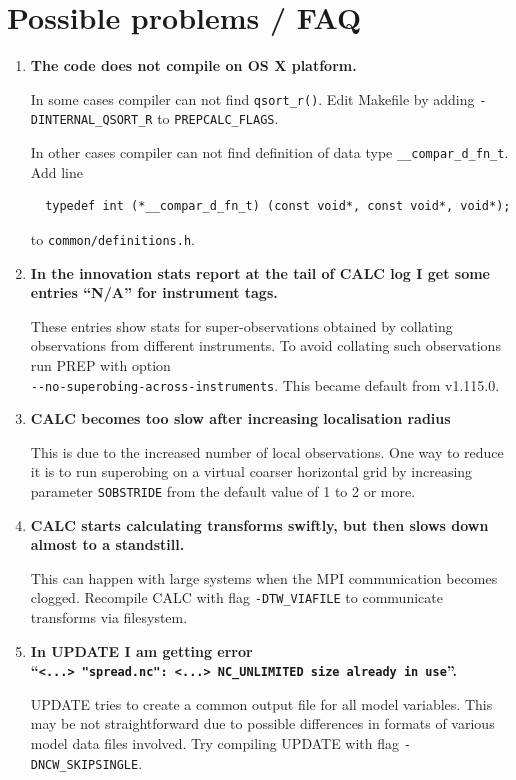 \documentclass[11pt]{report}
\begin{document}
\section{Possible problems / FAQ}

\begin{enumerate}

\item{\bf The code does not compile on OS X platform.}

In some cases compiler can not find \verb|qsort_r()|.
Edit Makefile by adding \verb|-DINTERNAL_QSORT_R| to \verb|PREPCALC_FLAGS|.

In other cases compiler can not find definition of data type \verb|__compar_d_fn_t|.
Add line
\begin{Verbatim}
  typedef int (*__compar_d_fn_t) (const void*, const void*, void*);
\end{Verbatim}
to \verb|common/definitions.h|.

\item{\bf In the innovation stats report at the tail of CALC log I get some entries ``N/A'' for instrument tags.}

These entries show stats for super-observations obtained by collating observations from different instruments.
To avoid collating such observations run PREP with option \\\verb|--no-superobing-across-instruments|.
This became default from v1.115.0.

\item{\bf CALC becomes too slow after increasing localisation radius}

This is due to the increased number of local observations.
One way to reduce it is to run superobing on a virtual coarser horizontal grid by increasing parameter \verb|SOBSTRIDE| from the default value of 1 to 2 or more.

\item{\bf CALC starts calculating transforms swiftly, but then slows down almost to a standstill.}

This can happen with large systems when the MPI communication becomes clogged.
Recompile CALC with flag \verb|-DTW_VIAFILE| to communicate transforms via filesystem.

\item{\bf In UPDATE I am getting error \\``\verb|<...> "spread.nc": <...> NC_UNLIMITED size already in use|''.}

UPDATE tries to create a common output file for all model variables.
This may be not straightforward due to possible differences in formats of various model data files involved.
Try compiling UPDATE with flag \verb|-DNCW_SKIPSINGLE|.

\end{enumerate}
\end{document}
